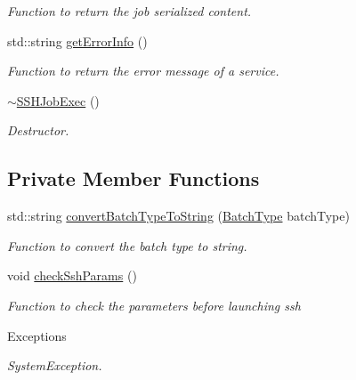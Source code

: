 \begin{DoxyCompactItemize}
\begin{DoxyCompactList}\small\item\em Function to return the job serialized content. \item\end{DoxyCompactList}\item 
std::string \hyperlink{classSSHJobExec_abf06bf930962ce64176116514620a20d}{getErrorInfo} ()
\begin{DoxyCompactList}\small\item\em Function to return the error message of a service. \item\end{DoxyCompactList}\item 
\hypertarget{classSSHJobExec_a99ad66768b94ddabf23ea33767d147da}{
\hyperlink{classSSHJobExec_a99ad66768b94ddabf23ea33767d147da}{$\sim$SSHJobExec} ()}
\label{classSSHJobExec_a99ad66768b94ddabf23ea33767d147da}

\begin{DoxyCompactList}\small\item\em Destructor. \item\end{DoxyCompactList}\end{DoxyCompactItemize}
\subsection*{Private Member Functions}
\begin{DoxyCompactItemize}
\item 
std::string \hyperlink{classSSHJobExec_a7299a222321c1ca1e32db976b1df79a2}{convertBatchTypeToString} (\hyperlink{utilVishnu_8hpp_a864d748e7097d176552dd4c7635016ea}{BatchType} batchType)
\begin{DoxyCompactList}\small\item\em Function to convert the batch type to string. \item\end{DoxyCompactList}\item 
\hypertarget{classSSHJobExec_a259bd8021df6638c9dff43ebe416f25d}{
void \hyperlink{classSSHJobExec_a259bd8021df6638c9dff43ebe416f25d}{checkSshParams} ()}
\label{classSSHJobExec_a259bd8021df6638c9dff43ebe416f25d}

\begin{DoxyCompactList}\small\item\em Function to check the parameters before launching ssh 
\begin{DoxyExceptions}{Exceptions}
\item[{\em SystemException.}]\end{DoxyExceptions}
\item\end{DoxyCompactList}\end{DoxyCompactItemize}
